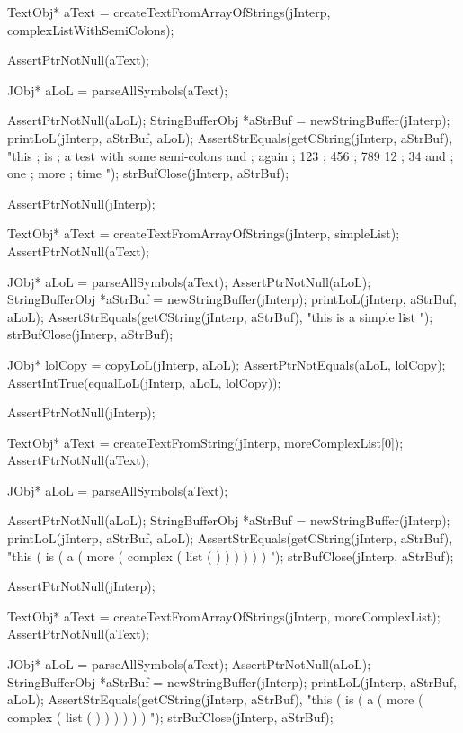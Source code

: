   TextObj* aText =
    createTextFromArrayOfStrings(jInterp, complexListWithSemiColons);

  AssertPtrNotNull(aText);

  JObj* aLoL = parseAllSymbols(aText);

  AssertPtrNotNull(aLoL);
  StringBufferObj *aStrBuf = newStringBuffer(jInterp);
  printLoL(jInterp, aStrBuf, aLoL);
  AssertStrEquals(getCString(jInterp, aStrBuf),
    "this ; is ; a test with some semi-colons and ; again ; 123 ; 456 ; 789 12 ; 34 and ; one ; more ; time ");
  strBufClose(jInterp, aStrBuf);
\stopCTest
\stopTestCase

\startCTest
  AssertPtrNotNull(jInterp);

  TextObj* aText =
    createTextFromArrayOfStrings(jInterp, simpleList);
  AssertPtrNotNull(aText);

  JObj* aLoL = parseAllSymbols(aText);
  AssertPtrNotNull(aLoL);
  StringBufferObj *aStrBuf = newStringBuffer(jInterp);
  printLoL(jInterp, aStrBuf, aLoL);
  AssertStrEquals(getCString(jInterp, aStrBuf), "this is a simple list ");
  strBufClose(jInterp, aStrBuf);

  JObj* lolCopy = copyLoL(jInterp, aLoL);
  AssertPtrNotEquals(aLoL, lolCopy);
  AssertIntTrue(equalLoL(jInterp, aLoL, lolCopy));
\stopCTest
\stopTestCase

\startCTest
  AssertPtrNotNull(jInterp);

  TextObj* aText =
    createTextFromString(jInterp, moreComplexList[0]);
  AssertPtrNotNull(aText);

  JObj* aLoL = parseAllSymbols(aText);

  AssertPtrNotNull(aLoL);
  StringBufferObj *aStrBuf = newStringBuffer(jInterp);
  printLoL(jInterp, aStrBuf, aLoL);
  AssertStrEquals(getCString(jInterp, aStrBuf),
    "this ( is ( a ( more ( complex ( list ( ) ) ) ) ) ) ");
  strBufClose(jInterp, aStrBuf);
\stopCTest
\stopTestCase

\startCTest
  AssertPtrNotNull(jInterp);

  TextObj* aText =
    createTextFromArrayOfStrings(jInterp, moreComplexList);
  AssertPtrNotNull(aText);

  JObj* aLoL = parseAllSymbols(aText);
  AssertPtrNotNull(aLoL);
  StringBufferObj *aStrBuf = newStringBuffer(jInterp);
  printLoL(jInterp, aStrBuf, aLoL);
  AssertStrEquals(getCString(jInterp, aStrBuf),
    "this ( is ( a ( more ( complex ( list ( ) ) ) ) ) ) ");
  strBufClose(jInterp, aStrBuf);
  
